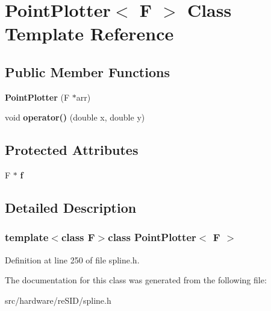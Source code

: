 \hypertarget{classPointPlotter}{\section{Point\-Plotter$<$ F $>$ Class Template Reference}
\label{classPointPlotter}
}
\subsection*{Public Member Functions}
\begin{DoxyCompactItemize}
\item 
\hypertarget{classPointPlotter_a377312e8bcf738a5a5df867c9549c262}{{\bfseries Point\-Plotter} (F $\ast$arr)}\label{classPointPlotter_a377312e8bcf738a5a5df867c9549c262}

\item 
\hypertarget{classPointPlotter_aa5cc3e7313cb4fe6af8bb194956e3aa0}{void {\bfseries operator()} (double x, double y)}\label{classPointPlotter_aa5cc3e7313cb4fe6af8bb194956e3aa0}

\end{DoxyCompactItemize}
\subsection*{Protected Attributes}
\begin{DoxyCompactItemize}
\item 
\hypertarget{classPointPlotter_af7177b104a28ad43bc47d42845b8bd25}{F $\ast$ {\bfseries f}}\label{classPointPlotter_af7177b104a28ad43bc47d42845b8bd25}

\end{DoxyCompactItemize}


\subsection{Detailed Description}
\subsubsection*{template$<$class F$>$class Point\-Plotter$<$ F $>$}



Definition at line 250 of file spline.\-h.



The documentation for this class was generated from the following file\-:\begin{DoxyCompactItemize}
\item 
src/hardware/re\-S\-I\-D/spline.\-h\end{DoxyCompactItemize}
